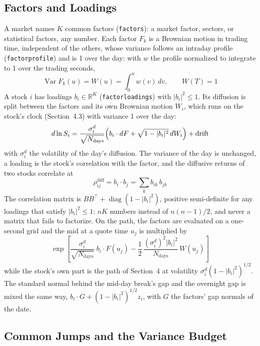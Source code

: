 \documentclass[11pt,a4paper]{article}
\newcommand{\key}[1]{\texttt{#1}}
\theoremstyle{paper}
\begin{document}
\subsection{Factors and Loadings}

A market names $K$ common factors (\key{factors}): a market factor, sectors, or statistical factors, any number. Each factor $F_k$ is a Brownian motion in trading time, independent of the others, whose variance follows an intraday profile (\key{factorprofile}) and is 1 over the day: with $w$ the profile normalized to integrate to 1 over the trading seconds,
\begin{equation}
\operatorname{Var}F_k(u)=W(u)=\int_0^u w(v)\,dv,\qquad W(T)=1
\end{equation}
A stock $i$ has loadings $b_i\in\mathbb R^K$ (\key{factorloadings}) with $|b_i|^2\le 1$. Its diffusion is split between the factors and its own Brownian motion $W_i$, which runs on the stock's clock (Section~4.3) with variance 1 over the day:
\begin{equation}
d\ln S_i=\frac{\sigma_i^{d}}{\sqrt{N_{\text{days}}}}\Bigl(b_i\cdot dF+\sqrt{1-|b_i|^2}\,dW_i\Bigr)+\text{drift}
\end{equation}
with $\sigma_i^{d}$ the volatility of the day's diffusion. The variance of the day is unchanged, a loading is the stock's correlation with the factor, and the diffusive returns of two stocks correlate at
\begin{equation}
\rho_{ij}^{\text{diff}}=b_i\cdot b_j=\sum_k b_{ik}\,b_{jk}
\end{equation}
The correlation matrix is $BB^{\top}+\operatorname{diag}(1-|b_i|^2)$, positive semi-definite for any loadings that satisfy $|b_i|^2\le1$: $nK$ numbers instead of $n(n-1)/2$, and never a matrix that fails to factorize. On the path, the factors are evaluated on a one-second grid and the mid at a quote time $u_j$ is multiplied by
\begin{equation}
\exp\!\left[\frac{\sigma_i^{d}}{\sqrt{N_{\text{days}}}}\;b_i\cdot F(u_j)-\frac12\,\frac{(\sigma_i^{d})^2|b_i|^2}{N_{\text{days}}}\,W(u_j)\right]
\end{equation}
while the stock's own part is the path of Section~4 at volatility $\sigma_i^{d}(1-|b_i|^2)^{1/2}$. The standard normal behind the mid-day break's gap and the overnight gap is mixed the same way, $b_i\cdot G+(1-|b_i|^2)^{1/2}z_i$, with $G$ the factors' gap normals of the date.

\subsection{Common Jumps and the Variance Budget}
\end{document}
